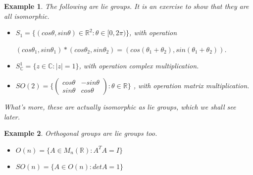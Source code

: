 \documentclass[12pt]{article}
\newcommand{\cx}{\mathbb{C}}
\newcommand{\real}{\mathbb{R}}
\newcommand{\abs}[1]{|#1|}
\newcommand\set[1]{\{#1\}}
\newtheorem{example}{Example}[thm]
\begin{document}
\begin{example}
  The following are lie groups. It is an exercise to show that they are all isomorphic.
\begin{itemize}
\item
  $S_1 = \set{(cos \theta, sin \theta) \in \real^2 : \theta \in [0,2\pi)}$, with operation
  \begin{center}
    $(cos \theta_1, sin \theta_1) * (cos \theta_2, sin \theta_2) = (cos (\theta_1 + \theta_2), sin (\theta_1 + \theta_2))$.
  \end{center}
 
\item
    $S_{\cx}^1 = \set{z \in \cx : \abs{z} = 1}$, with operation complex multiplication.

\item
    $SO(2) = \set{ \begin{pmatrix}
      cos \theta & - sin \theta\\
      sin \theta & cos \theta 
    \end{pmatrix} : \theta \in \real}$
  , with operation matrix multiplication.
\end{itemize}
What's more, these are actually isomorphic as lie groups, which we shall see later. 
\end{example}

\begin{example}
  Orthogonal groups are lie groups too.
  \begin{itemize}
  \item
    $O(n) = \set{A \in M_n(\real) : A^TA = I}$
  \item
    $SO(n) = \set{A \in O(n) : det A = 1}$
  \end{itemize}
\end{example}
\end{document}
